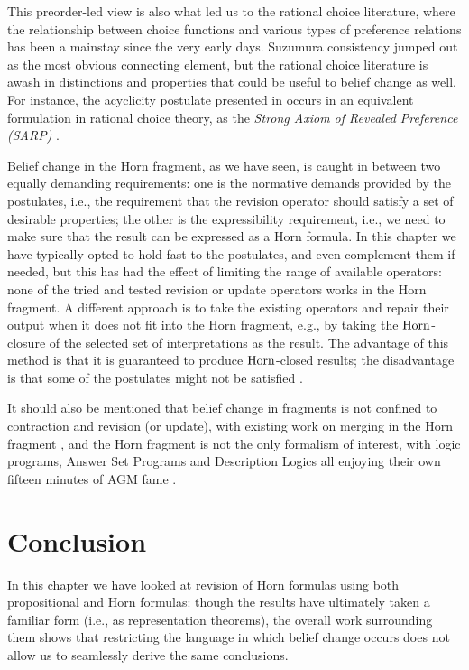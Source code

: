 This preorder-led view is also what led us to the rational choice literature,
where the relationship between choice functions and various types of preference 
relations has been a mainstay since the very early days. 
Suzumura consistency \cite{Suzumura76,Suzumura83,BossertS10} 
jumped out as the most obvious connecting element, but the rational choice literature 
is awash in distinctions and properties that could be useful to belief change as well. 
For instance, the acyclicity postulate presented in \cite{DelgrandeP15,DelgrandePW18}
occurs in an equivalent formulation in rational choice theory, as the 
\emph{Strong Axiom of Revealed Preference (SARP)} \cite{Hansson68,Suzumura16}.

Belief change in the Horn fragment, as we have seen, is caught in between 
two equally demanding requirements: one is the normative demands 
provided by the postulates,
i.e., the requirement that the revision operator should satisfy a set 
of desirable properties;
the other is the expressibility requirement,
i.e., we need to make sure that the result 
can be expressed as a Horn formula. 
In this chapter we have typically opted to hold fast to the postulates, and even 
complement them if needed, but this has had the effect of limiting the range 
of available operators: none of the tried and tested revision or update operators 
works in the Horn fragment. 
A different approach is to take the existing operators and repair their output when 
it does not fit into the Horn fragment, e.g., by taking the $\mathrm{Horn}$-closure of 
the selected set of interpretations as the result. 
The advantage of this method is that it is guaranteed to produce $\mathrm{Horn}$-closed
results; the disadvantage is that some of the postulates might not be satisfied 
\cite{CreignouPPW14,CreignouPRW16,CreignouKP18}.

It should also be mentioned that belief change in fragments is not 
confined to contraction and revision (or update), 
with existing work on merging in the Horn fragment
\cite{HaretRW15,HaretRW17},
and the Horn fragment is not the 
only formalism of interest,
with logic programs, Answer Set Programs and Description Logics 
all enjoying their own fifteen minutes of AGM fame
\cite{DelgrandeW13,ZhuangWWQ16,BinnewiesZWS18,ZhuangWWD19,ZheleznyakovKNC20}.










\section{Conclusion}\label{sec:6-conclusion}
In this chapter we have looked at revision of Horn formulas 
using both propositional and Horn formulas:
though the results have ultimately taken a familiar form
(i.e., as representation theorems),
the overall work surrounding them shows that restricting the 
language in which belief change occurs does not allow us 
to seamlessly derive the same conclusions.

